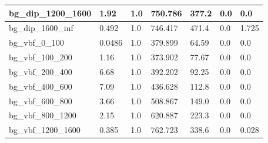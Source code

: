 \documentclass[a4paper, 10pt]{article}
\begin{document}
\begin{table}[H]
\begin{center}
\begin{tabular}{|m{23.0mm}|m{23.0mm}|m{18.0mm}|m{19.0mm}|m{19.0mm}|m{19.0mm}|m{19.0mm}|}
      \hline
      {\cellcolor{white}         bg\_dip\_1200\_1600}& {\cellcolor{white}         1.92}& {\cellcolor{white}         1.0}& {\cellcolor{white}         750.786}& {\cellcolor{white}         377.2}& {\cellcolor{green}         0.0}& {\cellcolor{green}         0.0}\\
      \hline
      {\cellcolor{white}         bg\_dip\_1600\_inf}& {\cellcolor{white}         0.492}& {\cellcolor{white}         1.0}& {\cellcolor{white}         746.417}& {\cellcolor{white}         471.4}& {\cellcolor{green}         0.0}& {\cellcolor{green}         1.725}\\
      \hline
      {\cellcolor{white}         bg\_vbf\_0\_100}& {\cellcolor{white}         0.0486}& {\cellcolor{white}         1.0}& {\cellcolor{white}         379.899}& {\cellcolor{white}         64.59}& {\cellcolor{green}         0.0}& {\cellcolor{green}         0.0}\\
      \hline
      {\cellcolor{white}         bg\_vbf\_100\_200}& {\cellcolor{white}         1.16}& {\cellcolor{white}         1.0}& {\cellcolor{white}         373.902}& {\cellcolor{white}         77.67}& {\cellcolor{green}         0.0}& {\cellcolor{green}         0.0}\\
      \hline
      {\cellcolor{white}         bg\_vbf\_200\_400}& {\cellcolor{white}         6.68}& {\cellcolor{white}         1.0}& {\cellcolor{white}         392.202}& {\cellcolor{white}         92.25}& {\cellcolor{green}         0.0}& {\cellcolor{green}         0.0}\\
      \hline
      {\cellcolor{white}         bg\_vbf\_400\_600}& {\cellcolor{white}         7.09}& {\cellcolor{white}         1.0}& {\cellcolor{white}         436.628}& {\cellcolor{white}         112.8}& {\cellcolor{green}         0.0}& {\cellcolor{green}         0.0}\\
      \hline
      {\cellcolor{white}         bg\_vbf\_600\_800}& {\cellcolor{white}         3.66}& {\cellcolor{white}         1.0}& {\cellcolor{white}         508.867}& {\cellcolor{white}         149.0}& {\cellcolor{green}         0.0}& {\cellcolor{green}         0.0}\\
      \hline
      {\cellcolor{white}         bg\_vbf\_800\_1200}& {\cellcolor{white}         2.15}& {\cellcolor{white}         1.0}& {\cellcolor{white}         620.887}& {\cellcolor{white}         223.3}& {\cellcolor{green}         0.0}& {\cellcolor{green}         0.0}\\
      \hline
      {\cellcolor{white}         bg\_vbf\_1200\_1600}& {\cellcolor{white}         0.385}& {\cellcolor{white}         1.0}& {\cellcolor{white}         762.723}& {\cellcolor{white}         338.6}& {\cellcolor{green}         0.0}& {\cellcolor{green}         0.028}\\

\end{tabular}
\end{center}
\end{table}
\end{document}
